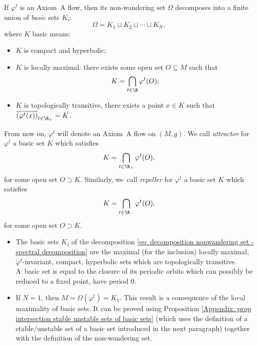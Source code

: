 \begin{prop}
If $\varphi^t$ is an Axiom~A flow, then its non-wandering set $\Omega$ decomposes into a finite union of \emph{basic} sets $K_i$:\vspace*{-3pt}
\begin{equation}\label{eq: decomposition nonwandering set - spectral decomposition}
\Omega = K_1 \sqcup K_2 \sqcup \cdots \sqcup K_N,
\end{equation}
where $K$ basic means:
\begin{itemize}
\item $K$ is compact and hyperbolic;
\item $K$ is locally maximal: there exists some open set $O\subseteq M$ such that\vspace*{-3pt}
\[
K = \bigcap_{t \in \R} \varphi^t (O);
\]
\item $K$ is topologically transitive, \ie there exists a point $x \in K$ such that \\$\overline{(\varphi^t(x))}_{t \in \R_+} = K$.
\end{itemize}
\end{prop}

From now on, $\varphi^t$ will denote an Axiom~A flow on $(M,g)$. We call \textit{attractor} for $\varphi^t$ a basic set $K$ which satisfies\vspace*{-3pt}
\[
K = \bigcap_{t \in \R_+} \varphi^t (O),
\]
for some open set $O \supset K$. Similarly, we~call \textit{repeller} for $\varphi^t$ a basic set $K$ which satisfies\vspace*{-3pt}
\[
K = \bigcap_{t \in \R_-} \varphi^t (O),
\]
for some open set $O \supset K$.

\skpt
\begin{remark}\label{rk: fixed point isolated}
\begin{itemize}
\item The basic sets $K_i$ of the decomposition \eqref{eq: decomposition nonwandering set - spectral decomposition} are the maximal (for the inclusion) locally maximal, $\varphi^t$-invariant, compact, hyperbolic sets which are topologically transitive. A~basic set is equal to the closure of its periodic orbits which can possibly be reduced to a fixed point, \ie have period $0$.
\item If $N = 1$, then $M = \Omega (\varphi^t) = K_1$. This result is a consequence of the local maximality of basic sets. It can be proved using Proposition \ref{Appendix: prop intersection stable unstable sets of basic sets} (which uses the definition of a stable/unstable set of a basic set introduced in the next paragraph) together with the definition of the non-wandering set.
\end{itemize}
\end{remark}

